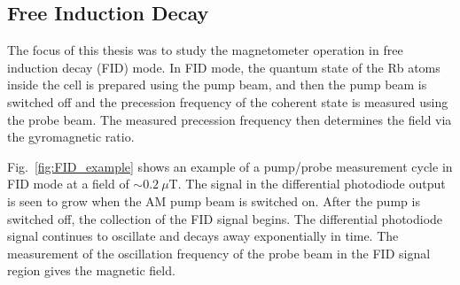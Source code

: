 






\subsection{Free Induction Decay}

The focus of this thesis was to study the magnetometer operation in
free induction decay (FID) mode.  In FID mode, the quantum state of
the Rb atoms inside the cell is prepared using the pump beam, and then
the pump beam is switched off and the precession frequency of the
coherent state is measured using the probe beam.  The measured
precession frequency then determines the field via the gyromagnetic
ratio.

Fig.~\ref{fig:FID_example} shows an example of a pump/probe
measurement cycle in FID mode at a field of $\sim 0.2~\mu$T.  The
signal in the differential photodiode output is seen to grow when the
AM pump beam is switched on.  After the pump is switched off, the
collection of the FID signal begins.  The differential photodiode
signal continues to oscillate and decays away exponentially in time.
The measurement of the oscillation frequency of the probe beam in the
FID signal region gives the magnetic field.

